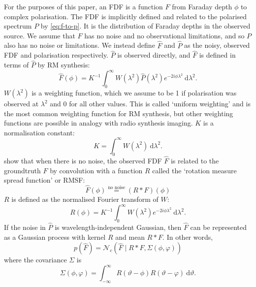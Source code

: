   For the purposes of this paper, an FDF is a function $F$ from Faraday depth $\phi$ to complex polarisation. The FDF is implicitly defined and related to the polarised spectrum $P$ by \autoref{eq:f-to-p}. It is the distribution of Faraday depths in the observed source. We assume that $F$ has no noise and no observational limitations, and so $P$ also has no noise or limitations. We instead define $\hat F$ and $\hat P$ as the noisy, observed FDF and polarisation respectively. $\hat P$ is observed directly, and $\hat F$ is defined in terms of $\hat P$ by RM synthesis:
  \begin{equation}
      \label{eq:faraday-rm-synthesis}
      \hat F(\phi) = K^{-1} \int_{0}^{\infty} W(\lambda^2) \hat P(\lambda^2) e^{-2i\phi\lambda^2}\ \mathrm{d}\lambda^2.
  \end{equation}
  $W(\lambda^2)$ is a weighting function, which we assume to be 1 if polarisation was observed at $\lambda^2$ and 0 for all other values. This is called `uniform weighting' and is the most common weighting function for RM synthesis, but other weighting functions are possible in analogy with radio synthesis imaging. $K$ is a normalisation constant:
  \begin{equation}
    \label{eq:faraday-k}
    K = \int_{0}^\infty W(\lambda^2)\ \mathrm{d}\lambda^2.
  \end{equation}
  \citet{brentjens_faraday_2005} show that when there is no noise, the observed FDF $\hat F$ is related to the groundtruth $F$ by convolution with a function $R$ called the `rotation measure spread function' or RMSF:
  \begin{equation}
    \label{eq:faraday-hat-f-r-ast-f}
    \hat F(\phi) \overset{\text{no noise}}{=} (R \ast F)(\phi)
  \end{equation}
  $R$ is defined as the normalised Fourier transform of $W$:
  \begin{equation}
    \label{eq:faraday-rmsf}
    R(\phi) = K^{-1} \int_{0}^{\infty} W(\lambda^2) e^{-2i\phi\lambda^2}\ \mathrm{d}{\lambda^2}.
  \end{equation}
  If the noise in $\hat P$ is wavelength-independent Gaussian, then $\hat F$ can be represented as a Gaussian process with kernel $R$ and mean $R \ast F$. In other words,
  \begin{equation}
    \label{eq:faraday-hat-f-distribution}
    p(\hat F) = \mathcal N_c(\hat F \mid R \ast F, \Sigma(\phi, \varphi))
  \end{equation}
  where the covariance $\Sigma$ is
  \begin{equation}
    \Sigma(\phi, \varphi) = \int_{-\infty}^\infty R(\vartheta - \phi) R(\vartheta - \varphi)\ \mathrm{d}\vartheta.
  \end{equation}
